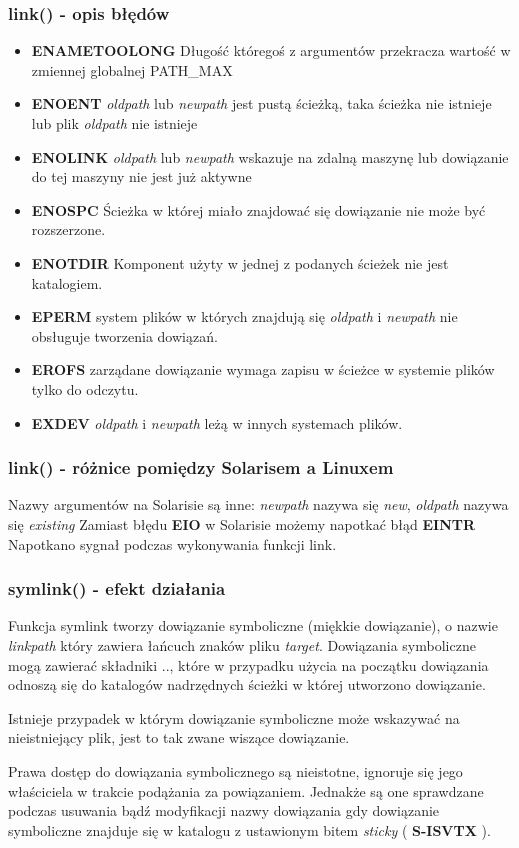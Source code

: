 \documentclass{beamer}
\begin{document}
\begin{frame}
	\frametitle{link() - opis błędów}
\begin{itemize}
\item \textbf{ENAMETOOLONG} Długość któregoś z argumentów 
przekracza wartość w zmiennej globalnej PATH\_MAX
\item \textbf{ENOENT}  \textit{oldpath} lub \textit{newpath} jest pustą ścieżką, taka ścieżka nie istnieje lub plik  \textit{oldpath} nie istnieje
\item \textbf{ENOLINK}  \textit{oldpath} lub \textit{newpath} wskazuje na zdalną maszynę lub dowiązanie do tej maszyny nie jest już aktywne
\item \textbf{ENOSPC}  Ścieżka w której miało znajdować się dowiązanie nie może być rozszerzone.
\item \textbf{ENOTDIR}  Komponent użyty w jednej z podanych ścieżek nie jest katalogiem.
\item \textbf{EPERM} system plików w których znajdują się \textit{oldpath} i \textit{newpath} nie obsługuje tworzenia dowiązań.
\item \textbf{EROFS} zarządane dowiązanie wymaga zapisu w ścieżce w systemie plików tylko do odczytu.
\item \textbf{EXDEV} \textit{oldpath} i \textit{newpath} leżą w innych systemach plików.
\end{itemize}
\end{frame}

\begin{frame}
	\frametitle{link() - różnice pomiędzy Solarisem a Linuxem}
Nazwy argumentów na Solarisie są inne:
\textit{newpath} nazywa się \textit{new},
\textit{oldpath} nazywa się \textit{existing}
Zamiast błędu \textbf{EIO} w Solarisie możemy napotkać błąd
\textbf{EINTR} Napotkano sygnał podczas wykonywania funkcji link.
\end{frame}

\begin{frame}
	\frametitle{symlink() - efekt działania}
Funkcja symlink tworzy dowiązanie symboliczne (miękkie dowiązanie), o nazwie \textit{linkpath} który zawiera łańcuch znaków pliku \textit{target}. Dowiązania symboliczne mogą zawierać składniki .., które w przypadku użycia na początku dowiązania odnoszą się do katalogów nadrzędnych ścieżki w której utworzono dowiązanie.

Istnieje przypadek w którym dowiązanie symboliczne może wskazywać na nieistniejący plik, jest to tak zwane wiszące dowiązanie.

Prawa dostęp do dowiązania symbolicznego są nieistotne, ignoruje się jego właściciela w trakcie podążania za powiązaniem. Jednakże są one sprawdzane podczas usuwania bądź modyfikacji nazwy dowiązania gdy dowiązanie symboliczne znajduje się w katalogu z ustawionym bitem \textit{sticky} ( \textbf{S-ISVTX} ).
\end{frame}
\end{document}
